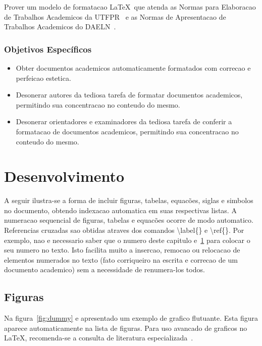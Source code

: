 \documentclass[openright]{normas-utf-tex} %
\begin{document}
Prover um modelo de formatacao \LaTeX\ que atenda as Normas para Elaboracao de Trabalhos Academicos da UTFPR~\cite{UTFPR2008} e as Normas de Apresentacao de Trabalhos Academicos do DAELN~\cite{DAELN2006}.

\subsection{Objetivos Específicos}

\begin{itemize}
	\item Obter documentos academicos automaticamente formatados com correcao e perfeicao estetica.
	\item Desonerar autores da tediosa tarefa de formatar documentos academicos, permitindo sua concentracao no conteudo do mesmo.
	\item Desonerar orientadores e examinadores da tediosa tarefa de conferir a formatacao de documentos academicos, permitindo sua concentracao no conteudo do mesmo.
\end{itemize}


\chapter{Desenvolvimento}
\label{chap:desenv}

A seguir ilustra-se a forma de incluir figuras, tabelas, equac\~oes, siglas e simbolos no documento, obtendo indexacao automatica em suas respectivas listas. A numeracao sequencial de figuras, tabelas e equac\~oes ocorre de modo automatico. Referencias cruzadas sao obtidas atraves dos comandos {\ttfamily \textbackslash label\{\}} e {\ttfamily \textbackslash ref\{\}}. Por exemplo, nao e necessario saber que o numero deste capitulo e~\ref{chap:desenv} para colocar o seu numero no texto. Isto facilita muito a insercao, remocao ou relocacao de elementos numerados no texto (fato corriqueiro na escrita e correcao de um documento academico) sem a necessidade de renumera-los todos.

\section{Figuras}

Na figura~\ref{fig:dummy} e apresentado um exemplo de grafico flutuante. Esta figura aparece automaticamente na lista de figuras. Para uso avancado de graficos no \LaTeX, recomenda-se a consulta de literatura especializada~\cite{Goossens2007}.
\end{document}
